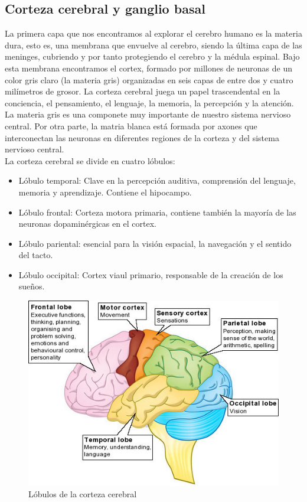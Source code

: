 \subsection{Corteza cerebral y ganglio basal}

La primera capa que nos encontramos al explorar el cerebro humano es la materia dura, esto es, una membrana que envuelve al cerebro, siendo la última capa de las meninges, cubriendo y por tanto protegiendo el cerebro y la médula espinal. Bajo esta membrana encontramos el cortex, formado por millones de neuronas de un color gris claro (la materia gris) organizadas en seis capas de entre dos y cuatro milímetros de grosor. La corteza cerebral juega un papel trascendental en la conciencia, el pensamiento, el lenguaje, la memoria, la percepción y la atención. La materia gris es una componete muy importante de nuestro sistema nervioso central. Por otra parte, la matria blanca está formada por axones que interconectan las neuronas en diferentes regiones de la corteza y del sistema nervioso central. \\

La corteza cerebral se divide en cuatro lóbulos: \\

\begin{itemize}
	\item Lóbulo temporal: Clave en la percepción auditiva, comprensión del lenguaje, memoria y aprendizaje. Contiene el hipocampo.
	\item Lóbulo frontal: Corteza motora primaria, contiene también la mayoría de las neuronas dopaminérgicas en el cortex.
	\item Lóbulo pariental: esencial para la visión espacial, la navegación y el sentido del tacto.
	\item Lóbulo occipital: Cortex viaul primario, responsable de la creación de los sueños.
\end{itemize}

\begin{figure}[H] %
	\centering
	\includegraphics[scale=0.6]{bl.jpg}  %
	\caption{Lóbulos de la corteza cerebral} 
	\label{fig:bl}
\end{figure}

